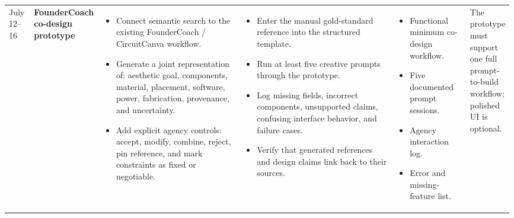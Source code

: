 \documentclass{article}
\begin{document}
\begin{landscape}
\begin{longtable}{
    L{0.05\linewidth}
    L{0.08\linewidth}
    L{0.3\linewidth}
    L{0.33\linewidth}
    L{0.15\linewidth}
    L{0.08\linewidth}
}
July 12--16
&
\textbf{FounderCoach co-design prototype}
&
\begin{itemize}[leftmargin=*,nosep]
    \item Connect semantic search to the existing FounderCoach /
    CircuitCanva workflow.
    \item Generate a joint representation of:
    aesthetic goal, components, material, placement, software,
    power, fabrication, provenance, and uncertainty.
    \item Add explicit agency controls:
    accept, modify, combine, reject, pin reference, and mark
    constraints as fixed or negotiable.
\end{itemize}
&
\begin{itemize}[leftmargin=*,nosep]
    \item Enter the manual gold-standard reference into the structured
    template.
    \item Run at least five creative prompts through the prototype.
    \item Log missing fields, incorrect components, unsupported claims,
    confusing interface behavior, and failure cases.
    \item Verify that generated references and design claims link back
    to their sources.
\end{itemize}
&
\begin{itemize}[leftmargin=*,nosep]
    \item Functional minimum co-design workflow.
    \item Five documented prompt sessions.
    \item Agency interaction log.
    \item Error and missing-feature list.
\end{itemize}
&
The prototype must support one full prompt-to-build workflow;
polished UI is optional.
\\


\end{longtable}
\end{landscape}
\end{document}
